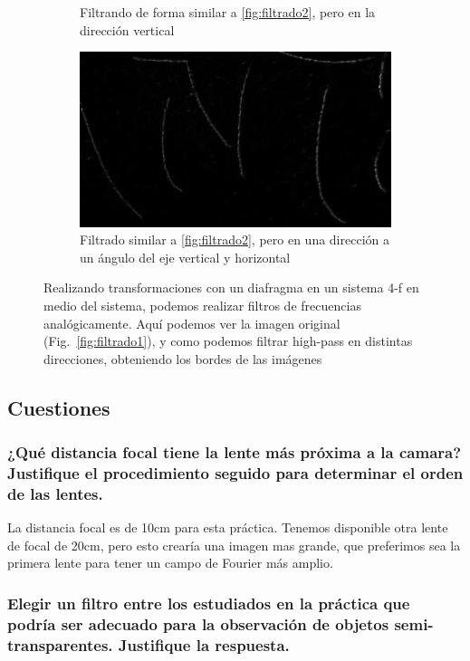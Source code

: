 \documentclass{./packages/optica-article}
\begin{document}
\begin{figure}[hptb]
\begin{center}
\begin{subfigure}[t]{0.45\textwidth}
			\caption{Filtrando de forma similar a \ref{fig:filtrado2}, pero en la dirección vertical}
			\label{fig:filtrado3}
		\end{subfigure}
		\quad
		\begin{subfigure}[t]{0.45\textwidth}\centering
			\includegraphics[width=\textwidth]{parte4-filtrado/4f-pic-2ocm-diafragm-10cm-camera-letters-high-frequency-dot-right-a-bit-down.png}
			\caption{Filtrado similar a \ref{fig:filtrado2}, pero en una dirección a un ángulo del eje vertical y horizontal}
		\end{subfigure}
		\caption{Realizando transformaciones con un diafragma en un sistema 4-f en medio del sistema, podemos realizar filtros de frecuencias analógicamente. Aquí podemos ver la imagen original (Fig.~\ref{fig:filtrado1}), y como podemos filtrar high-pass en distintas direcciones, obteniendo los bordes de las imágenes}
		\label{fig:filtrado:all}
	\end{center}
\end{figure}

\subsection{Cuestiones}
\subsubsection{¿Qué distancia focal tiene la lente más próxima a la camara? Justifique el procedimiento seguido para determinar el orden de las lentes.}
La distancia focal es de 10cm para esta práctica. Tenemos disponible otra lente de focal de 20cm, pero esto crearía una imagen mas grande, que preferimos sea la primera lente para tener un campo de Fourier más amplio.

\subsubsection{Elegir un filtro entre los estudiados en la práctica que podría ser adecuado para la observación de objetos semi-transparentes. Justifique la respuesta.}
\end{document}
